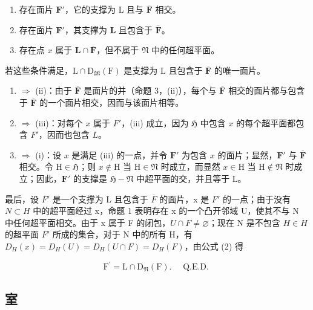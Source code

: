 \begin{enumerate}
\def\labelenumi{(\roman{enumi})}
\item
存在面片 \(\mathbf{F}'\)，它的支撑为 L 且与 \(\overline{\mathbf{F}}\) 相交。
\item
存在面片 \(\mathbf{F}'\)，其支撑为 \(\mathbf{L}\) 且包含于 \(\overline{\mathbf{F}}\)。
\item
存在点 \(x\) 属于 \(\mathbf{L} \cap \overline{\mathbf{F}}\)，但不属于 \(\mathfrak{N}\) 中的任何超平面。
\end{enumerate}

若这些条件满足，\(\mathrm{L} \cap \mathrm{D}_{\mathfrak{M}}(\mathrm{F})\) 是支撑为 \(\mathrm{L}\) 且包含于 \(\overline{\mathbf{F}}\) 的唯一面片。

\begin{enumerate}
\def\labelenumi{(\roman{enumi})}
\item
\(\Longrightarrow\) (ii)：由于 \(\overline{\mathbf{F}}\) 是面片的并（命题 3，(ii)），每个与 \(\overline{\mathbf{F}}\) 相交的面片都与包含于 \(\overline{\mathbf{F}}\) 的一个面片相交，因而与该面片相等。
\item
\(\Longrightarrow\) (iii)：对每个 \(x\) 属于 \(F'\)，(iii) 成立，因为 \(\mathfrak{H}\) 中包含 \(x\) 的每个超平面都包含 \(F'\)，因而也包含 \(L\)。
\item
\(\Longrightarrow\) (i)：设 \(x\) 是满足 (iii) 的一点，并令 \(\mathbf{F}'\) 为包含 \(x\) 的面片；显然，\(\mathbf{F}'\) 与 \(\overline{\mathbf{F}}\) 相交。令 \(\mathrm{H} \in \mathfrak{H}\)；则 \(x \notin \mathrm{H}\) 当 \(\mathrm{H} \in \mathfrak{N}\) 时成立，而显然 \(x \in \mathrm{H}\) 当 \(\mathrm{H} \notin \mathfrak{N}\) 时成立；因此，\(\mathbf{F}'\) 的支撑是 \(\mathfrak{H} - \mathfrak{N}\) 中超平面的交，并且等于 \(\mathrm{L}\)。
\end{enumerate}

最后，设 \(F'\) 是一个支撑为 L 且包含于 \(\overline{F}\) 的面片，x 是 \(F'\) 的一点；由于没有 \(N \subset H\) 中的超平面经过 x，命题 1 表明存在 x 的一个凸开邻域 U，使其不与 N 中任何超平面相交。由于 x 属于 F 的闭包，\(U \cap F \neq \varnothing\)；现在 N 是不包含 \(H \in H\) 的超平面 \(F'\) 所成的集合，对于 N 中的所有 H，有 \(D_{H}(x) = D_{H}(U) = D_{H}(U \cap F) = D_{H}(F)\)，由公式 (2) 得

\[
\mathrm{F} ^ {\prime} = \mathrm{L} \cap \mathrm{D} _ {\mathfrak {N}} (\mathrm{F}). \quad \text { Q.E.D. }
\]

\subsection{室}


